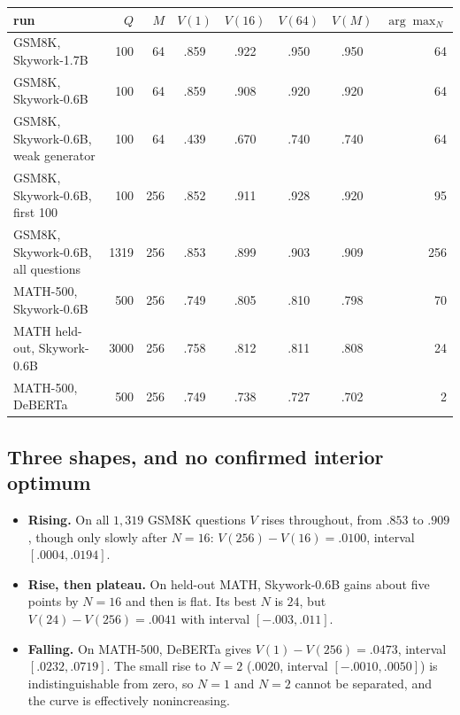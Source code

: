 \documentclass[11pt]{article}
\theoremstyle{definition}
\theoremstyle{remark}
\begin{document}
\begin{center}
\small
\begin{tabular}{lrrccccr}
\toprule
run & $Q$ & $M$ & $V(1)$ & $V(16)$ & $V(64)$ & $V(M)$ & $\arg\max_N$ \\
\midrule
GSM8K, Skywork-1.7B                   & 100  & 64  & .859 & .922 & .950 & .950 & 64 \\
GSM8K, Skywork-0.6B                   & 100  & 64  & .859 & .908 & .920 & .920 & 64 \\
GSM8K, Skywork-0.6B, weak generator   & 100  & 64  & .439 & .670 & .740 & .740 & 64 \\
GSM8K, Skywork-0.6B, first 100        & 100  & 256 & .852 & .911 & .928 & .920 & 95 \\
GSM8K, Skywork-0.6B, all questions    & 1319 & 256 & .853 & .899 & .903 & .909 & 256 \\
MATH-500, Skywork-0.6B                & 500  & 256 & .749 & .805 & .810 & .798 & 70 \\
MATH held-out, Skywork-0.6B           & 3000 & 256 & .758 & .812 & .811 & .808 & 24 \\
MATH-500, DeBERTa                     & 500  & 256 & .749 & .738 & .727 & .702 & 2 \\
\bottomrule
\end{tabular}
\end{center}

\subsection{Three shapes, and no confirmed interior optimum}

\begin{itemize}[leftmargin=*]
\item \textbf{Rising.} On all $1{,}319$ GSM8K questions $V$ rises throughout, from $.853$ to $.909$,
though only slowly after $N=16$: $V(256)-V(16)=.0100$, interval $[.0004,.0194]$.
\item \textbf{Rise, then plateau.} On held-out MATH, Skywork-0.6B gains about five points by $N=16$ and then is
flat. Its best $N$ is $24$, but $V(24)-V(256)=.0041$ with interval $[-.003,.011]$.
\item \textbf{Falling.} On MATH-500, DeBERTa gives $V(1)-V(256)=.0473$, interval $[.0232,.0719]$. The small
rise to $N=2$ ($.0020$, interval $[-.0010,.0050]$) is indistinguishable from zero, so $N=1$ and $N=2$ cannot
be separated, and the curve is effectively nonincreasing.
\end{itemize}
\end{document}
